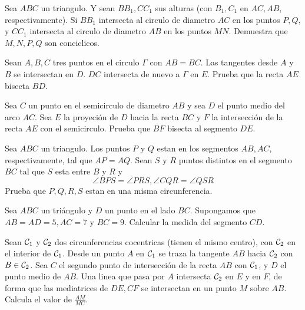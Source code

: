 \documentclass[11pt]{scrartcl}
\newcommand{\thmdifficulty}{0}
\newcommand{\problemdiff}[1]{\renewcommand{\thmdifficulty}{#1}}
\begin{document}
\problemdiff{2}
\begin{problem}
    Sea $ABC$ un triangulo. Y sean $BB_1, CC_1$ sus alturas (con $B_1,C_1$ en $AC,AB$, respectivamente). Si $BB_1$ intersecta al circulo de diametro $AC$ en los puntos $P,Q$, y $CC_1$ intersecta al circulo de diametro $AB$ en los puntos $MN$. Demuestra que $M,N,P,Q$ son conciclicos.
\end{problem}
\problemdiff{2.5}
\begin{problem}
    Sean $A,B,C$ tres puntos en el circulo $\Gamma$ con $AB=BC$. Las tangentes desde $A$ y $B$ se intersectan en $D$. $DC$ intersecta de nuevo a $\Gamma$ en $E$. Prueba que la recta $AE$ bisecta $BD$. 
\end{problem}


\problemdiff{3}
\begin{problem}
    Sea $C$ un punto en el semicirculo de diametro $AB$ y sea $D$ el punto medio del arco $AC$. Sea $E$ la proyeción de $D$ hacia la recta $BC$ y $F$ la intersección de la recta $AE$ con el semicirculo. Prueba que $BF$ bisecta al segmento $DE$. 
\end{problem}


\problemdiff{3}
\begin{problem}

    Sea $ABC$ un triangulo. Los puntos $P$ y $Q$ estan en los segmentos $AB,AC$, respectivamente, tal que $AP=AQ$. Sean $S$ y $R$ puntos distintos en el segmento $BC$ tal que $S$ esta entre $B$ y $R$ y 
    \[\angle BPS= \angle PRS , \angle CQR= \angle QSR\]
    Prueba que $P,Q,R,S$ estan en una misma circunferencia.
\end{problem}

\problemdiff{3}
\begin{problem}
    Sea $ABC$ un triángulo y $D$ un punto en
el lado $BC$. Supongamos que $AB = AD = 5, AC = 7$ y
$BC = 9$. Calcular la medida del segmento $CD$.
\end{problem}


\problemdiff{3}
\begin{problem}
    Sean ${\cal C}_1$ y ${\cal C}_2$ dos circunferencias cocentricas (tienen el mismo centro), con ${\cal C}_2$ en el interior de ${\cal C}_1$. Desde un punto $A$ en ${\cal C}_1$ se traza la tangente $AB$ hacia ${\cal C}_2$ con $B\in {\cal C}_2$. Sea $C$ el segundo punto de intersección 
    de la recta $AB$ con ${\cal C}_1$, y $D$ el punto medio de $AB$. Una linea que pasa por $A$ intersecta ${\cal C}_2$ en $E$ y en $F$, de forma que las mediatrices de $DE,CF$ se intersectan en un punto $M$ sobre $AB$. Calcula el valor de $\frac{AM}{MC}$.
\end{problem}
\end{document}
